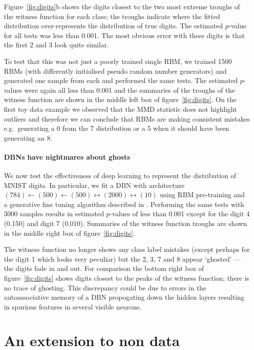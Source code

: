 \documentclass{article} %
\def\eg{e.g.\ }
\begin{document}
Figure~\ref{fig:digits}b shows the digits closest to the two most extreme troughs of the witness function for each class; the troughs indicate where the fitted distribution over-represents the distribution of true digits.
The estimated $p$-value for all tests was less than 0.001.
The most obvious error with these digits is that the first 2 and 3 look quite similar.

To test that this was not just a poorly trained single RBM, we trained 1500 RBMs (with differently initialised pseudo random number generators) and generated one sample from each and performed the same tests.
The estimated $p$-values were again all less than 0.001 and the summaries of the troughs of the witness function are shown in the middle left box of figure~\ref{fig:digits}.
On the first toy data example we observed that the MMD statistic does not highlight outliers and therefore we can conclude that RBMs are making consistent mistakes \eg generating a 0 from the 7 distribution or a 5 when it should have been generating an 8.

\paragraph{DBNs have nightmares about ghosts}

We now test the effectiveness of deep learning to represent the distribution of MNIST digits.
In particular, we fit a DBN with architecture $(784)\leftarrow(500)\leftarrow(500)\leftrightarrow(2000)\leftrightarrow(10)$ using RBM pre-training and a generative fine tuning algorithm described in \cite{Hinton2006-yw}.
Performing the same tests with 3000 samples results in estimated $p$-values of less than 0.001 except for the digit 4 (0.150) and digit 7 (0.010).
Summaries of the witness function troughs are shown in the middle right box of figure~\ref{fig:digits}.

The witness function no longer shows any class label mistakes (except perhaps for the digit 1 which looks very peculiar) but the 2, 3, 7 and 8 appear `ghosted' --- the digits fade in and out.
For comparison the bottom right box of figure~\ref{fig:digits} shows digits closest to the peaks of the witness function; there is no trace of ghosting.
This discrepancy could be due to errors in the autoassociative memory of a DBN propogating down the hidden layers resulting in spurious features in several visible neurons.

\section{An extension to non \iid data}
\label{sec:non_iid}
\end{document}
